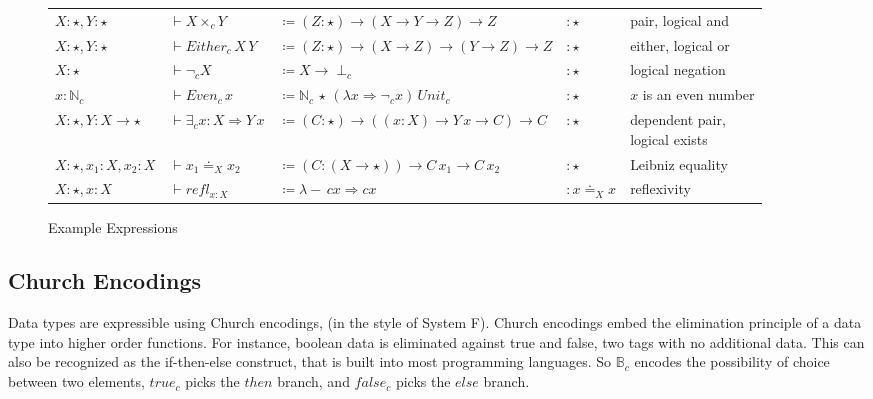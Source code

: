 \begin{sidewaysfigure}
\begin{tabular}{lllll}
$X:\star,Y:\star$ & $\vdash X\times_{c}Y$ & $\coloneqq\left(Z:\star\right)\rightarrow(X\rightarrow Y\rightarrow Z)\rightarrow Z$ & $:\star$ & pair, logical and\tabularnewline
$X:\star,Y:\star$ & $\vdash Either_{c}\,X\,Y$ & $\coloneqq\left(Z:\star\right)\rightarrow(X\rightarrow Z)\rightarrow(Y\rightarrow Z)\rightarrow Z$ & $:\star$ & either, logical or\tabularnewline
$X:\star$ & $\vdash\lnot_{c}X$ & $\coloneqq X\rightarrow\perp_{c}$ & $:\star$ & logical negation\tabularnewline
$x:\mathbb{N}_{c}$ & $\vdash Even_{c}\,x$ & $\coloneqq\mathbb{N}_{c}\,\star\,\left(\lambda x\Rightarrow\lnot_{c}x\right)\,Unit_{c}$ & $:\star$ & $x$ is an even number\tabularnewline
$X:\star,Y:X\rightarrow\star$ & $\vdash\exists_{c}x:X\Rightarrow Y\,x$ & $\coloneqq\left(C:\star\right)\rightarrow\left((x:X)\rightarrow Y\,x\rightarrow C\right)\rightarrow C$ & $:\star$ & \makecell[l]{dependent pair,\\ logical exists}\tabularnewline
$X:\star,x_{1}:X,x_{2}:X$ & $\vdash x_{1}\doteq_{X}x_{2}$ & $\coloneqq\left(C:\left(X\rightarrow\star\right)\right)\rightarrow C\,x_{1}\rightarrow C\,x_{2}$ & $:\star$ & Leibniz equality\tabularnewline
$X:\star,x:X$ & $\vdash refl_{x:X}$ & $\coloneqq\lambda-\,cx\Rightarrow cx$ & $:x\doteq_{X}x$ & reflexivity\tabularnewline
\end{tabular}


\caption{Example \SLang{} Expressions}
\label{fig:surface-examples}
\end{sidewaysfigure}

\subsection{Church Encodings}

Data types are expressible using Church encodings, (in the style of System F).
Church encodings embed the elimination principle of a data type into higher order functions.
For instance, boolean data is eliminated against true and false, two tags with no additional data.
This can also be recognized as the if-then-else construct, that is built into most programming languages.
So $\mathbb{B}_{c}$ encodes the possibility of choice between two elements, $true_{c}$ picks the $then$ branch, and $false_{c}$ picks the $else$ branch.

